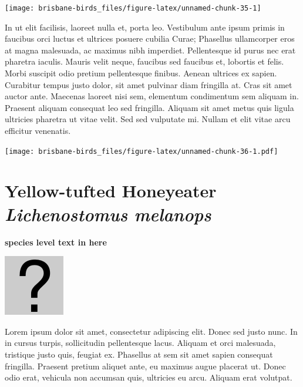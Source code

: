 \documentclass[]{book}
\let\origfigure\figure
\let\endorigfigure\endfigure
\renewenvironment{figure}[1][2] {
  \expandafter\origfigure\expandafter[H]
} {
  \endorigfigure
}
\begin{document}
\begin{figure}
\texttt{[image: brisbane-birds\_files/figure-latex/unnamed-chunk-35-1]} \caption{insert figure caption}\label{fig:unnamed-chunk-35}
\end{figure}

In ut elit facilisis, laoreet nulla et, porta leo. Vestibulum ante ipsum
primis in faucibus orci luctus et ultrices posuere cubilia Curae;
Phasellus ullamcorper eros at magna malesuada, ac maximus nibh
imperdiet. Pellentesque id purus nec erat pharetra iaculis. Mauris velit
neque, faucibus sed faucibus et, lobortis et felis. Morbi suscipit odio
pretium pellentesque finibus. Aenean ultrices ex sapien. Curabitur
tempus justo dolor, sit amet pulvinar diam fringilla at. Cras sit amet
auctor ante. Maecenas laoreet nisi sem, elementum condimentum sem
aliquam in. Praesent aliquam consequat leo sed fringilla. Aliquam sit
amet metus quis ligula ultricies pharetra ut vitae velit. Sed sed
vulputate mi. Nullam et elit vitae arcu efficitur venenatis.

\begin{figure}
\centering
\texttt{[image: brisbane-birds\_files/figure-latex/unnamed-chunk-36-1.pdf]}
\caption{\label{fig:unnamed-chunk-36}insert figure caption}
\end{figure}

\section{\texorpdfstring{Yellow-tufted Honeyeater \emph{Lichenostomus
melanops}}{Yellow-tufted Honeyeater Lichenostomus melanops}}\label{yellow-tufted-honeyeater-lichenostomus-melanops}

\textbf{species level text in here}

\begin{figure}
\centering
\includegraphics{assets/missing.png}
\caption{No image for species}
\end{figure}

Lorem ipsum dolor sit amet, consectetur adipiscing elit. Donec sed justo
nunc. In in cursus turpis, sollicitudin pellentesque lacus. Aliquam et
orci malesuada, tristique justo quis, feugiat ex. Phasellus at sem sit
amet sapien consequat fringilla. Praesent pretium aliquet ante, eu
maximus augue placerat ut. Donec odio erat, vehicula non accumsan quis,
ultricies eu arcu. Aliquam erat volutpat.
\end{document}
